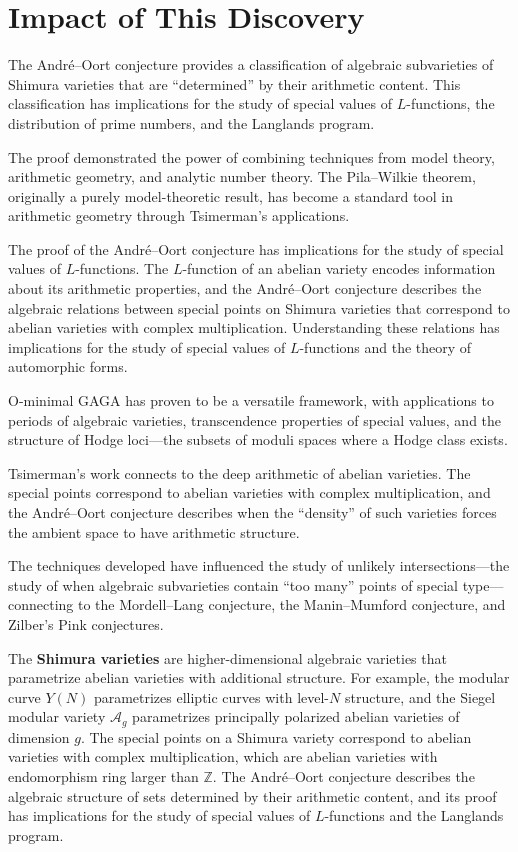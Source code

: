 \section{Impact of This Discovery}

The Andr\'{e}--Oort conjecture provides a classification of algebraic subvarieties of Shimura varieties that are ``determined'' by their arithmetic content. This classification has implications for the study of special values of $L$-functions, the distribution of prime numbers, and the Langlands program.

The proof demonstrated the power of combining techniques from model theory, arithmetic geometry, and analytic number theory. The Pila--Wilkie theorem, originally a purely model-theoretic result, has become a standard tool in arithmetic geometry through Tsimerman's applications.

The proof of the Andr\'{e}--Oort conjecture has implications for the study of special values of $L$-functions. The $L$-function of an abelian variety encodes information about its arithmetic properties, and the Andr\'{e}--Oort conjecture describes the algebraic relations between special points on Shimura varieties that correspond to abelian varieties with complex multiplication. Understanding these relations has implications for the study of special values of $L$-functions and the theory of automorphic forms.

O-minimal GAGA has proven to be a versatile framework, with applications to periods of algebraic varieties, transcendence properties of special values, and the structure of Hodge loci---the subsets of moduli spaces where a Hodge class exists.

Tsimerman's work connects to the deep arithmetic of abelian varieties. The special points correspond to abelian varieties with complex multiplication, and the Andr\'{e}--Oort conjecture describes when the ``density'' of such varieties forces the ambient space to have arithmetic structure.

The techniques developed have influenced the study of unlikely intersections---the study of when algebraic subvarieties contain ``too many'' points of special type---connecting to the Mordell--Lang conjecture, the Manin--Mumford conjecture, and Zilber's Pink conjectures.

The \textbf{Shimura varieties} are higher-dimensional algebraic varieties that parametrize abelian varieties with additional structure. For example, the modular curve $Y(N)$ parametrizes elliptic curves with level-$N$ structure, and the Siegel modular variety $\mathcal{A}_g$ parametrizes principally polarized abelian varieties of dimension $g$. The special points on a Shimura variety correspond to abelian varieties with complex multiplication, which are abelian varieties with endomorphism ring larger than $\mathbb{Z}$. The Andr\'{e}--Oort conjecture describes the algebraic structure of sets determined by their arithmetic content, and its proof has implications for the study of special values of $L$-functions and the Langlands program.

